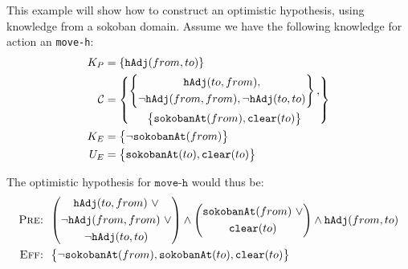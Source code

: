 \documentclass[\master/Master.tex]{subfiles}
\begin{document}
	\begin{example}
		This example will show how to construct an optimistic hypothesis, using knowledge from a sokoban domain.
		Assume we have the following knowledge for action an \texttt{move-h}:
		 	\begin{equation*}
			 	\begin{split}
				 	K_P & = \left\{\texttt{hAdj}(from, to) \right\} \\
					\mathcal{C}& =	\left\{
							\begin{gathered}
								\left\{
								\begin{gathered}
									\texttt{hAdj}(to, from), \\
									\neg\texttt{hAdj}(from, from), \neg\texttt{hAdj}(to, to)
								\end{gathered}
								\right\},	\\ \left\{
								\begin{gathered}
									\texttt{sokobanAt}(from), \texttt{clear}(to)
								\end{gathered}
								\right\}
							\end{gathered}
							\right\}
				 	\\
				 	K_E& =
						 	\left\{
						 	\begin{gathered}
							 	\neg\texttt{sokobanAt}(from)
						 	\end{gathered}
						 	\right\}
					\\
				 	U_E& =
					 	\left\{
					 	\begin{gathered}
						 	\texttt{sokobanAt}(to),
						 	\texttt{clear}(to)
					 	\end{gathered}
					 	\right\}
				\end{split}
		 	\end{equation*}

		The optimistic hypothesis for $\texttt{move-h}$ would thus be:
			\begin{equation*}
				\begin{split}
					\textsc{Pre: } & \left(
									 \begin{gathered}
									   \texttt{hAdj}(to, from) ~ \lor \\
									  \neg\texttt{hAdj}(from, from) ~ \lor \\ \neg\texttt{hAdj}(to, to)
									 \end{gathered}
								  \right) \land
								  \left(
									  \begin{gathered}
										  \texttt{sokobanAt}(from) ~ \lor \\ \texttt{clear}(to)
									  \end{gathered}
								  \right) \land \texttt{hAdj}(from, to) \\
					\textsc{Eff: } & 	\left\{
									\begin{gathered}
										\neg\texttt{sokobanAt}(from),
										\texttt{sokobanAt}(to),
										\texttt{clear}(to)
									\end{gathered}
								\right\}
				\end{split}
			\end{equation*}
	\end{example}
\end{document}
